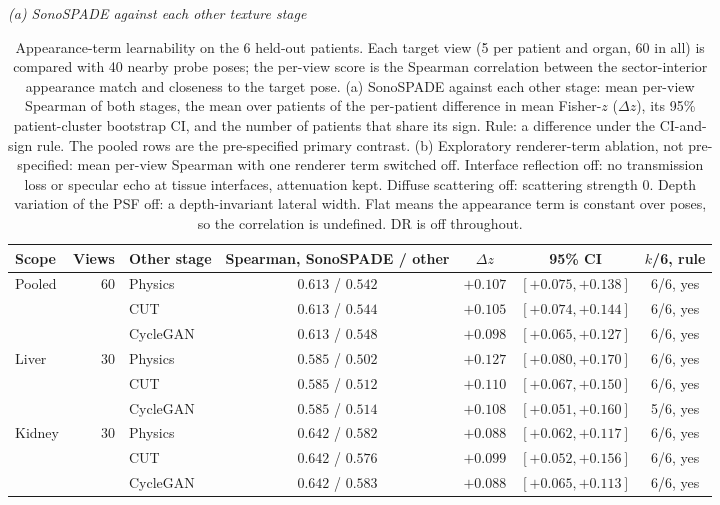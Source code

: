 
\begin{table}[tp]
\caption{Appearance-term learnability on the 6 held-out patients. Each target view (5 per patient and organ, 60 in all) is compared with 40 nearby probe poses; the per-view score is the Spearman correlation between the sector-interior appearance match and closeness to the target pose. (a) SonoSPADE against each other stage: mean per-view Spearman of both stages, the mean over patients of the per-patient difference in mean Fisher-$z$ ($\Delta z$), its 95\% patient-cluster bootstrap CI, and the number of patients that share its sign. Rule: a difference under the CI-and-sign rule. The pooled rows are the pre-specified primary contrast. (b) Exploratory renderer-term ablation, not pre-specified: mean per-view Spearman with one renderer term switched off. Interface reflection off: no transmission loss or specular echo at tissue interfaces, attenuation kept. Diffuse scattering off: scattering strength 0. Depth variation of the PSF off: a depth-invariant lateral width. Flat means the appearance term is constant over poses, so the correlation is undefined. DR is off throughout.}
\label{tab:learnability}
\centering
\renewcommand{\baselinestretch}{1}\small
\textit{(a) SonoSPADE against each other texture stage}\\[2pt]
\begin{tabular}{@{}lrlcccc@{}}
\toprule
Scope & Views & Other stage & Spearman, SonoSPADE / other & $\Delta z$ & 95\% CI & $k$/6, rule \\
\midrule
Pooled & 60 & Physics & $0.613$ / $0.542$ & $+0.107$ & $[+0.075, +0.138]$ & 6/6, yes \\
 &  & CUT & $0.613$ / $0.544$ & $+0.105$ & $[+0.074, +0.144]$ & 6/6, yes \\
 &  & CycleGAN & $0.613$ / $0.548$ & $+0.098$ & $[+0.065, +0.127]$ & 6/6, yes \\
\addlinespace
Liver & 30 & Physics & $0.585$ / $0.502$ & $+0.127$ & $[+0.080, +0.170]$ & 6/6, yes \\
 &  & CUT & $0.585$ / $0.512$ & $+0.110$ & $[+0.067, +0.150]$ & 6/6, yes \\
 &  & CycleGAN & $0.585$ / $0.514$ & $+0.108$ & $[+0.051, +0.160]$ & 5/6, yes \\
\addlinespace
Kidney & 30 & Physics & $0.642$ / $0.582$ & $+0.088$ & $[+0.062, +0.117]$ & 6/6, yes \\
 &  & CUT & $0.642$ / $0.576$ & $+0.099$ & $[+0.052, +0.156]$ & 6/6, yes \\
 &  & CycleGAN & $0.642$ / $0.583$ & $+0.088$ & $[+0.065, +0.113]$ & 6/6, yes \\
\bottomrule
\end{tabular}


\end{table}
